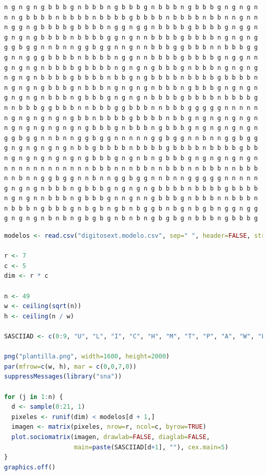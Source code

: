 \documentclass[12pt, letterpaper] {article}
\begin{document}
\begin{lstlisting}[language=R]
n g n g n g b b b g n b b b n g b b b g n b b b n g b b b g n g n g n
n n g b b b b n b b b b n b b b b g b b b b n b b b b n b b n n g n n
n g g n g b b b b g b b b b n g g n g g n b b b b g b b b b g n g g n
g n g n g b b b b n b b b b g g n g n n b b b b g b b b b n g n g n g
g g b g g n n b n n g g b g g n n g n n b b b g g b b b n n b b b g g
g n n g g g b b b b n b b b b n g g n n b b b b g b b b b g n g g n n
g n g n g n b b b b g b b b b n g n g n g b b b g n b b b n g n g n g
n g n g n b b b b g b b b b n b b g n g b b b b n b b b b g b b b b n
n g n g n g b b b g n b b b n g n g n g n b b b n g b b b g n g n g n
g n g n g n b b b n g b b b g n g n g n b b b b g b b b b n b b b b g
n n b b b g g b b b n n b b b g g b b b n n b b b g g g g g n n n n n
n g n g n g n g n g b b n b b b b g b b b b n b b g n g n g n g n g n
n g n g n g n g n g n g b b b g n b b b n g b b b g n g n g n g n g n
g g b g g n n b n n g g b g g n n n n n g g b g g n n b n n g g b g g
g n g n g n g n g n b b g b b b b n b b b b g b b b b n b b b b g b b
n g n g n g n g n g n g b b b g n g n b n g b b b g n g n g n g n g n
n n n n n n n n n n n n b b b n n n b b n n b b b n n b b b n n b b b
n n b n n g g b g g n n b n n g g b g g n n b n n g g g g g n n n n n
g n g n g n b b b n g b b b g n g n g n g b b b b n b b b b g b b b b
n g n g n n b b b n g b b b g n n g n n g b b b g n b b b n n b b b n
n b b b n g b b b g n b g b n g b n b g g b n b g n b g b n g g n g g
g n g n g n b n b n g b g b g n b n b n g b g b g n b b b n g b b b g
\end{lstlisting}

\begin{lstlisting}[language=R]
modelos <- read.csv("digitosext.modelo.csv", sep=" ", header=FALSE, stringsAsFactors=F)

r <- 7
c <- 5
dim <- r * c

n <- 49
w <- ceiling(sqrt(n))
h <- ceiling(n / w)

SASCIIAD <- c(0:9, "U", "L", "I", "C", "H", "M", "T", "P", "A", "W", "E", "F",)

png("plantilla.png", width=1600, height=2000)
par(mfrow=c(w, h), mar = c(0,0,7,0))
suppressMessages(library("sna"))

for (j in 1:n) {
  d <- sample(0:21, 1)
  pixeles <- runif(dim) < modelos[d + 1,] 
  imagen <- matrix(pixeles, nrow=r, ncol=c, byrow=TRUE)
  plot.sociomatrix(imagen, drawlab=FALSE, diaglab=FALSE, 
                   main=paste(SASCIIAD[d+1], ""), cex.main=5)
}
graphics.off()
\end{lstlisting}
\end{document}

